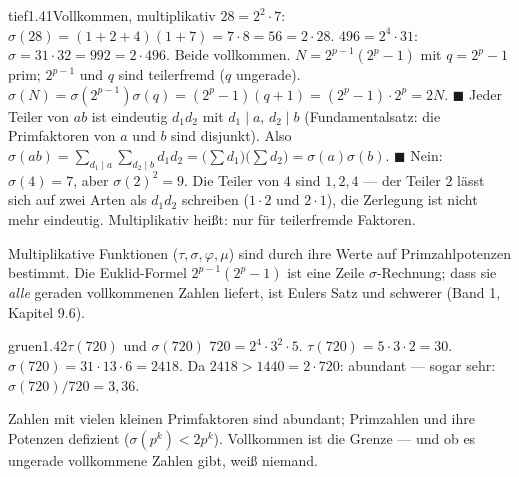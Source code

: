 \begin{loesungkarte}{tief}{1.41}{Vollkommen, multiplikativ}
$28 = 2^{2}\cdot7$: $\sigma(28) = (1 + 2 + 4)(1 + 7) = 7\cdot8 = 56 = 2\cdot28$. $496 = 2^{4}\cdot31$: $\sigma = 31\cdot32 = 992 = 2\cdot496$. Beide vollkommen.
$N = 2^{p-1}(2^{p} - 1)$ mit $q = 2^{p} - 1$ prim; $2^{p-1}$ und $q$ sind teilerfremd ($q$ ungerade). $\sigma(N) = \sigma(2^{p-1})\sigma(q) = (2^{p} - 1)(q + 1) = (2^{p} - 1)\cdot2^{p} = 2N$. $\blacksquare$
Jeder Teiler von $ab$ ist eindeutig $d_1d_2$ mit $d_1\mid a$, $d_2\mid b$ (Fundamentalsatz: die Primfaktoren von $a$ und $b$ sind disjunkt). Also $\sigma(ab) = \sum_{d_1\mid a}\sum_{d_2\mid b}d_1d_2 = \bigl(\sum d_1\bigr)\bigl(\sum d_2\bigr) = \sigma(a)\sigma(b)$. $\blacksquare$
Nein: $\sigma(4) = 7$, aber $\sigma(2)^{2} = 9$. Die Teiler von $4$ sind $1, 2, 4$ --- der Teiler $2$ lässt sich auf zwei Arten als $d_1d_2$ schreiben ($1\cdot2$ und $2\cdot1$), die Zerlegung ist nicht mehr eindeutig. Multiplikativ heißt: nur für teilerfremde Faktoren.
\begin{mitnehmen}\kastentext
Multiplikative Funktionen ($\tau, \sigma, \varphi, \mu$) sind durch ihre Werte auf Primzahlpotenzen bestimmt. Die Euklid-Formel $2^{p-1}(2^{p} - 1)$ ist eine Zeile $\sigma$-Rechnung; dass sie \emph{alle} geraden vollkommenen Zahlen liefert, ist Eulers Satz und schwerer (Band 1, Kapitel 9.6).
\end{mitnehmen}
\end{loesungkarte}

\begin{loesungkarte}{gruen}{1.42}{$\tau(720)$ und $\sigma(720)$}
$720 = 2^{4}\cdot3^{2}\cdot5$. $\tau(720) = 5\cdot3\cdot2 = 30$. $\sigma(720) = 31\cdot13\cdot6 = 2418$. Da $2418 > 1440 = 2\cdot720$: abundant --- sogar sehr: $\sigma(720)/720 = 3{,}36$.
\begin{mitnehmen}\kastentext
Zahlen mit vielen kleinen Primfaktoren sind abundant; Primzahlen und ihre Potenzen defizient ($\sigma(p^{k}) < 2p^{k}$). Vollkommen ist die Grenze --- und ob es ungerade vollkommene Zahlen gibt, weiß niemand.
\end{mitnehmen}
\end{loesungkarte}

